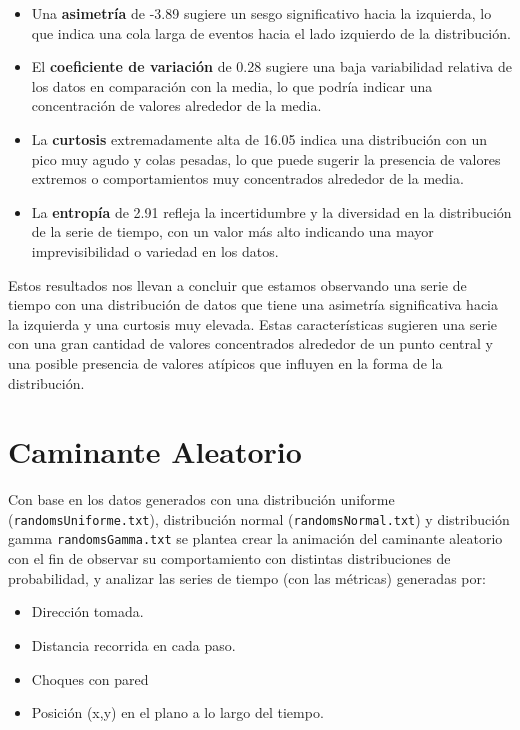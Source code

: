 \documentclass[11pt]{article} %
\begin{document}
\begin{itemize}
		\item Una \textbf{asimetría} de -3.89 sugiere un sesgo significativo hacia la izquierda, lo que indica una cola larga de eventos hacia el lado izquierdo de la distribución.
		
		\item El \textbf{coeficiente de variación} de 0.28 sugiere una baja variabilidad relativa de los datos en comparación con la media, lo que podría indicar una concentración de valores alrededor de la media.
		
		\item La \textbf{curtosis} extremadamente alta de 16.05 indica una distribución con un pico muy agudo y colas pesadas, lo que puede sugerir la presencia de valores extremos o comportamientos muy concentrados alrededor de la media.
		
		\item La \textbf{entropía} de 2.91 refleja la incertidumbre y la diversidad en la distribución de la serie de tiempo, con un valor más alto indicando una mayor imprevisibilidad o variedad en los datos.
	\end{itemize}
	
	Estos resultados nos llevan a concluir que estamos observando una serie de tiempo con una distribución de datos que tiene una asimetría significativa hacia la izquierda y una curtosis muy elevada. Estas características sugieren una serie con una gran cantidad de valores concentrados alrededor de un punto central y una posible presencia de valores atípicos que influyen en la forma de la distribución.
	
	
	\section{Caminante Aleatorio}
	
	Con base en los datos generados con una distribución uniforme (\texttt{randomsUniforme.txt}), distribución normal (\texttt{randomsNormal.txt}) y distribución gamma \texttt{randomsGamma.txt} se plantea crear la animación del caminante aleatorio con el fin de observar su comportamiento con distintas distribuciones de probabilidad, y analizar las series de tiempo (con las métricas) generadas por:
	
	\begin{itemize}
		\item Dirección tomada.
		\item Distancia recorrida en cada paso.
		\item Choques con pared
		\item Posición (x,y) en el plano a lo largo del tiempo.
	\end{itemize}
	
\end{document}
